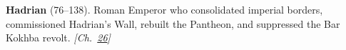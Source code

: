 \textbf{Hadrian} (76–138). Roman Emperor who consolidated imperial borders, commissioned Hadrian's Wall, rebuilt the Pantheon, and suppressed the Bar Kokhba revolt. \emph{[Ch.~\hyperref[ch:jewishcalendar]{26}]}

